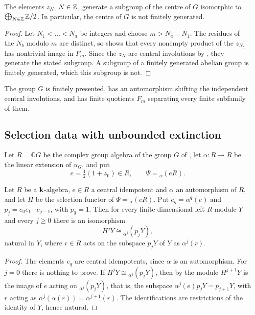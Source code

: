 \begin{corollary}
  \label{coro:z-independent}
  The elements $z_N$, ${N\in\mathbb{Z}}$, generate a subgroup of the centre of $G$
  isomorphic to $\bigoplus_{N\in\mathbb{Z}}\mathbb{Z}/2$. In particular, the centre of $G$ is
  not finitely generated.
\end{corollary}

\begin{proof}
  Let ${N_1<\dots<N_a}$ be integers and choose ${m>N_a-N_1}$. The residues of the
  $N_b$ modulo $m$ are distinct, so  shows that
  every nonempty product of the $z_{N_b}$ has nontrivial image in $F_m$. Since
  the $z_N$ are central involutions by , they
  generate the stated subgroup. A subgroup of a finitely generated abelian
  group is finitely generated, which this subgroup is not.
\end{proof}

The group $G$ is finitely presented, has an automorphism shifting the
independent central involutions, and has finite quotients $F_m$ separating every
finite subfamily of them.

\subsection{Selection data with unbounded extinction}
\label{subsec:unbounded-extinction}

Let ${R=\mathbb{C}G}$ be the complex group algebra of the group $G$ of
, let ${\alpha\colon R\to R}$ be the linear extension
of $\alpha_G$, and put
\[
  e=\tfrac12(1+z_0)\in R,\qquad\Psi={}_\alpha(eR).
\]

\begin{lemma}
  \label{lemma:selection-iterates}
  Let $R$ be a $\mathbf{k}$-algebra, ${e\in R}$ a central idempotent and $\alpha$ an
  automorphism of $R$, and let $H$ be the selection functor of
  ${\Psi={}_\alpha(eR)}$. Put ${e_q=\alpha^q(e)}$ and ${p_j=e_0e_1\cdots e_{j-1}}$,
  with ${p_0=1}$. Then for every finite-dimensional left $R$-module $Y$ and every
  ${j\geq0}$ there is an isomorphism
  \[
    H^jY\cong{}_{\alpha^j}(p_jY),
  \]
  natural in $Y$, where ${r\in R}$ acts on the subspace $p_jY$ of $Y$ as
  $\alpha^j(r)$.
\end{lemma}

\begin{proof}
  The elements $e_q$ are central idempotents, since $\alpha$ is an
  automorphism. For ${j=0}$ there is nothing to prove. If
  ${H^jY\cong{}_{\alpha^j}(p_jY)}$, then by  the module
  $H^{j+1}Y$ is the image of $e$ acting on ${}_{\alpha^j}(p_jY)$, that is, the
  subspace ${\alpha^j(e)p_jY=p_{j+1}Y}$, with $r$ acting as
  ${\alpha^j(\alpha(r))=\alpha^{j+1}(r)}$. The identifications are restrictions
  of the identity of $Y$, hence natural.
\end{proof}

